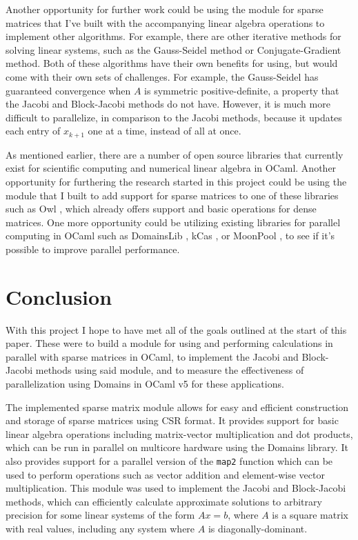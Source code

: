 \documentclass[pageno]{jpaper}
\begin{document}
\begin{doublespacing}
Another opportunity for further work could be using the module for sparse matrices that I've built with the accompanying linear algebra operations to implement other algorithms. For example, there are other iterative methods for solving linear systems, such as the Gauss-Seidel method or Conjugate-Gradient method. Both of these algorithms have their own benefits for using, but would come with their own sets of challenges. For example, the Gauss-Seidel has guaranteed convergence when $A$ is symmetric positive-definite, a property that the Jacobi and Block-Jacobi methods do not have. However, it is much more difficult to parallelize, in comparison to the Jacobi methods, because it updates each entry of $x_{k + 1}$ one at a time, instead of all at once.

As mentioned earlier, there are a number of open source libraries that currently exist for scientific computing and numerical linear algebra in OCaml. Another opportunity for furthering the research started in this project could be using the module that I built to add support for sparse matrices to one of these libraries such as Owl \cite{ocaml-owl}, which already offers support and basic operations for dense matrices. One more opportunity could be utilizing existing libraries for parallel computing in OCaml such as DomainsLib \cite{ocaml-domainslib}, kCas \cite{ocaml-kcas}, or MoonPool \cite{ocaml-moonpool}, to see if it’s possible to improve parallel performance.


\section{Conclusion}
With this project I hope to have met all of the goals outlined at the start of this paper. These were to build a module for using and performing calculations in parallel with sparse matrices in OCaml, to implement the Jacobi and Block-Jacobi methods using said module, and to measure the effectiveness of parallelization using Domains in OCaml v5 for these applications. 

The implemented sparse matrix module allows for easy and efficient construction and storage of sparse matrices using CSR format. It provides support for basic linear algebra operations including matrix-vector multiplication and dot products, which can be run in parallel on multicore hardware using the Domains library. It also provides support for a parallel version of the \verb|map2| function which can be used to perform operations such as vector addition and element-wise vector multiplication. This module was used to implement the Jacobi and Block-Jacobi methods, which can efficiently calculate approximate solutions to arbitrary precision for some linear systems of the form $Ax = b$, where $A$ is a square matrix with real values, including any system where $A$ is diagonally-dominant.


\end{doublespacing}
\end{document}
